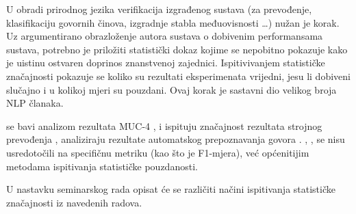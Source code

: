 U obradi prirodnog jezika  verifikacija izgrađenog sustava (za prevođenje, klasifikaciju govornih činova, izgradnje stabla međuovisnosti \dots) nužan je korak. Uz argumentirano obrazloženje autora sustava o dobivenim performansama sustava, potrebno je priložiti statistički dokaz kojime se nepobitno pokazuje kako je uistinu ostvaren doprinos znanstvenoj zajednici. Ispitivivanjem statističke značajnosti pokazuje se koliko su rezultati eksperimenata vrijedni, jesu li dobiveni slučajno i u kolikoj mjeri su pouzdani. Ovaj korak je sastavni dio velikog broja NLP članaka.

\citep{chinchor1992statistical} se bavi analizom rezultata MUC-4 , \citep{koehn2004statistical} i \citep{zhang2004interpreting} ispituju značajnost rezultata strojnog prevođenja , \citep{bisani2004bootstrap} analiziraju rezultate automatskog prepoznavanja govora . \citep{berg2012empirical}, \citep{yeh2000more} , \citep{thompson1993use} se nisu usredotočili na specifičnu metriku (kao što je F1-mjera), već općenitijim metodama ispitivanja statističke pouzdanosti.

U nastavku seminarskog rada opisat će se različiti načini ispitivanja statističke značajnosti iz navedenih radova.  
